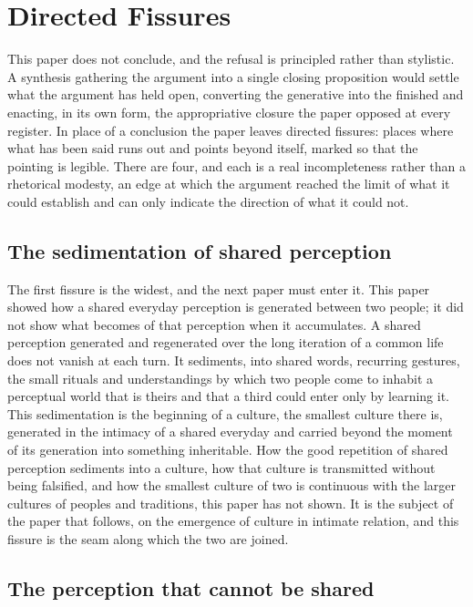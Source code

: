 \section{Directed Fissures}
\label{p23:sec:fissures}

\noindent
This paper does not conclude, and the refusal is principled rather than stylistic. A synthesis gathering the argument into a single closing proposition would settle what the argument has held open, converting the generative into the finished and enacting, in its own form, the appropriative closure the paper opposed at every register. In place of a conclusion the paper leaves directed fissures: places where what has been said runs out and points beyond itself, marked so that the pointing is legible. There are four, and each is a real incompleteness rather than a rhetorical modesty, an edge at which the argument reached the limit of what it could establish and can only indicate the direction of what it could not.

\subsection{The sedimentation of shared perception}
\label{p23:sub:fiss-culture}

The first fissure is the widest, and the next paper must enter it. This paper showed how a shared everyday perception is generated between two people; it did not show what becomes of that perception when it accumulates. A shared perception generated and regenerated over the long iteration of a common life does not vanish at each turn. It sediments, into shared words, recurring gestures, the small rituals and understandings by which two people come to inhabit a perceptual world that is theirs and that a third could enter only by learning it. This sedimentation is the beginning of a culture, the smallest culture there is, generated in the intimacy of a shared everyday and carried beyond the moment of its generation into something inheritable. How the good repetition of shared perception sediments into a culture, how that culture is transmitted without being falsified, and how the smallest culture of two is continuous with the larger cultures of peoples and traditions, this paper has not shown. It is the subject of the paper that follows, on the emergence of culture in intimate relation, and this fissure is the seam along which the two are joined.

\subsection{The perception that cannot be shared}
\label{p23:sub:fiss-untranslatable}

